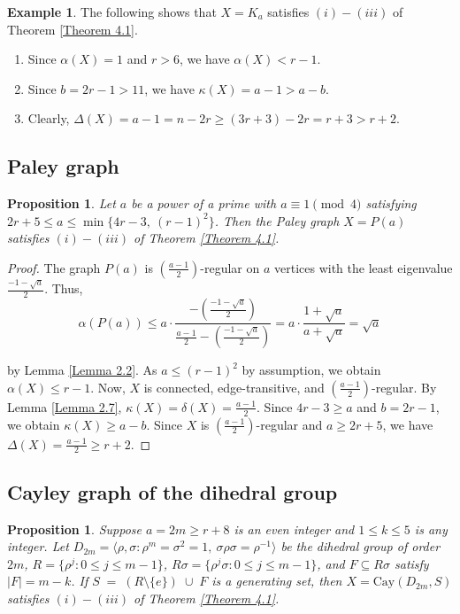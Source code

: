 \documentclass[12pt,reqno,a4paper]{amsart}
\theoremstyle{definition}
\newtheorem{prop}[defn]{Proposition}
\newtheorem{example}[defn]{Example}
\begin{document}
\begin{example}\label{Example 4.2}
The following shows that $X=K_{a}$ satisfies $(i)-(iii)$ of Theorem \ref{Theorem 4.1}.

\begin{enumerate}[$(i)$]
    \item Since $\alpha(X) = 1$ and $r>6$, we have $\alpha(X)< r-1$.
    
    \item Since $b=2r-1> 11$, we have $\kappa(X) = a-1> a-b$. 
    
    \item Clearly, $\Delta(X) = a-1=n-2r\geq (3r+3)-2r=r+3> r+2$.
\end{enumerate}
\end{example}
\subsection{Paley graph}

\begin{prop}\label{Proposition 4.3}
{\em Let $a$ be a power of a prime with
$a\equiv1\pmod4$ satisfying 
$2r+5 \leq a \leq \min\{4r-3,\ (r-1)^2\}$.
Then the Paley graph $X=P(a)$ satisfies $(i)-(iii)$ of Theorem \ref{Theorem 4.1}.}
\end{prop}

\begin{proof}
The graph $P(a)$ is $(\frac{a-1}{2})$-regular on $a$ vertices with the least eigenvalue $\frac{-1-\sqrt a}{2}$. Thus,
\[
\alpha(P(a))
\le a\cdot\frac{-(\frac{-1-\sqrt a}{2})}
{\frac{a-1}{2} - (\frac{-1-\sqrt a}{2})}
= a\cdot\frac{1+\sqrt a}{a+\sqrt a}
= \sqrt a
\]

by Lemma \ref{Lemma 2.2}.  As $a\le (r-1)^2$ by assumption, we obtain $\alpha(X)\le r-1$.
Now, $X$ is connected, edge-transitive, and $(\frac{a-1}{2})$-regular.  By Lemma \ref{Lemma 2.7}, $\kappa(X)=\delta(X)=\frac{a-1}{2}$. Since $4r-3\geq a$ and $b=2r-1$, we obtain $\kappa(X)\geq a-b$.
Since $X$ is $(\frac{a-1}{2})$-regular and $a\geq 2r+5$, we have $\Delta(X)=\frac{a-1}{2}\geq r+2$. 
\end{proof}

\subsection{Cayley graph of the dihedral group}

\begin{prop}\label{Proposition 4.4}
{\em Suppose $a=2m\geq r+8$ is an even integer and $1\leq k\leq 5$ is any integer. 
Let $D_{2m}=\langle \rho,\sigma : \rho^m=\sigma^2=1,\ \sigma\rho\sigma=\rho^{-1}\rangle$ 
be the dihedral group of order $2m$, $R=\{\rho^j:0\le j\le m-1\}$, $R\sigma=\{\rho^j\sigma:0\le j\le m-1\}$, and $F\subseteq R\sigma$ satisfy $|F|=m-k$.
If $S \;=\; (R\setminus\{e\}) \;\cup\; F$ is a generating set,
then $X=\mathrm{Cay}(D_{2m},S)$ satisfies $(i)-(iii)$ of Theorem \ref{Theorem 4.1}.}
\end{prop}
\end{document}
